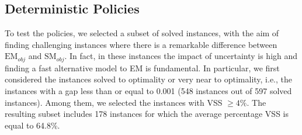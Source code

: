 \documentclass[preprint,11pt,authoryear]{elsarticle}
\begin{document}



\subsection{Deterministic Policies}\label{detpolicies}

To test the policies, we selected a subset of solved instances, with the aim of finding challenging instances where there is a remarkable difference between $\text{EM}_{obj}$ and $\text{SM}_{obj}$. In fact, in these instances the impact of uncertainty is high and finding a fast alternative model to EM is fundamental.  In particular, we first considered the instances solved to optimality or very near to optimality, i.e., the instances with a gap less than or equal to 0.001
(548 instances out of 597 solved instances). Among them, we selected the instances with VSS $\geq 4\%$. The resulting subset includes 178 instances for which the average percentage VSS is equal to 64.8\%.
\end{document}
